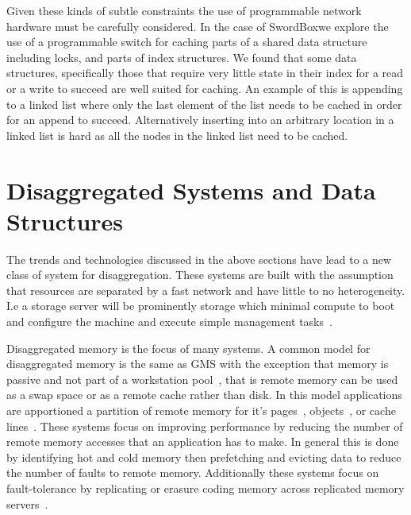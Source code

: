 \documentclass[12pt]{ucsddissertation}
\newcommand{\sword}{SwordBox}
\begin{document}
Given these kinds of subtle constraints the use of programmable network hardware must be carefully
considered. In the case of \sword we explore the use of a programmable switch for caching parts of a
shared data structure including locks, and parts of index structures. We found that some data
structures, specifically those that require very little state in their index for a read or a write
to succeed are well suited for caching. An example of this is appending to a linked list where only
the last element of the list needs to be cached in order for an append to succeed. Alternatively
inserting into an arbitrary location in a linked list is hard as all the nodes in the linked list
need to be cached.

\section{Disaggregated Systems and Data Structures}

The trends and technologies discussed in the above sections have lead to a new class of system for
disaggregation. These systems are built with the assumption that resources are separated by a fast
network and have little to no heterogeneity. I.e a storage server will be prominently storage which
minimal compute to boot and configure the machine and execute simple management
tasks~\cite{aguilera2019designing,fast-networks,dis-and-app,legoos}.

Disaggregated memory is the focus of many systems. A common model for disaggregated memory is the
same as GMS with the exception that memory is passive and not part of a workstation pool~\cite{gms},
that is remote memory can be used as a swap space or as a remote cache rather than disk. In this
model applications are apportioned a partition of remote memory for it's
pages~\cite{infiniswap,fastswap,leap,blade-server,legoos,hydra}, objects~\cite{aifm,carbink}, or
cache lines~\cite{kona}. These systems focus on improving performance by reducing the number of
remote memory accesses that an application has to make. In general this is done by identifying hot
and cold memory then prefetching and evicting data to reduce the number of faults to remote memory.
Additionally these systems focus on fault-tolerance by replicating or erasure coding memory across
replicated memory servers~\cite{hydra}.
\end{document}
